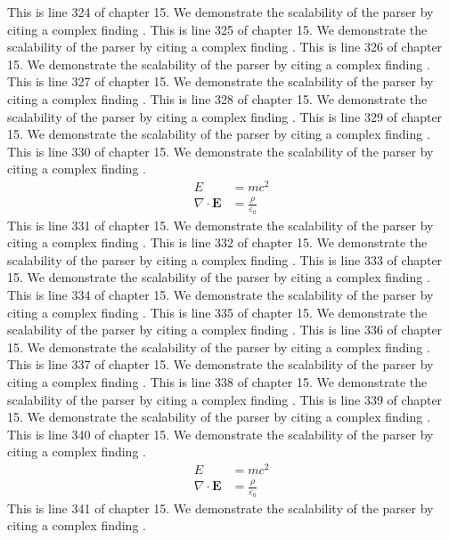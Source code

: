 This is line 324 of chapter 15. We demonstrate the scalability of the parser by citing a complex finding \cite{ref15_324}.
This is line 325 of chapter 15. We demonstrate the scalability of the parser by citing a complex finding \cite{ref15_325}.
This is line 326 of chapter 15. We demonstrate the scalability of the parser by citing a complex finding \cite{ref15_326}.
This is line 327 of chapter 15. We demonstrate the scalability of the parser by citing a complex finding \cite{ref15_327}.
This is line 328 of chapter 15. We demonstrate the scalability of the parser by citing a complex finding \cite{ref15_328}.
This is line 329 of chapter 15. We demonstrate the scalability of the parser by citing a complex finding \cite{ref15_329}.
This is line 330 of chapter 15. We demonstrate the scalability of the parser by citing a complex finding \cite{ref15_330}.
\begin{align*}
  E &= mc^2 \\
  \nabla \cdot \mathbf{E} &= \frac{\rho}{\varepsilon_0}
\end{align*}
This is line 331 of chapter 15. We demonstrate the scalability of the parser by citing a complex finding \cite{ref15_331}.
This is line 332 of chapter 15. We demonstrate the scalability of the parser by citing a complex finding \cite{ref15_332}.
This is line 333 of chapter 15. We demonstrate the scalability of the parser by citing a complex finding \cite{ref15_333}.
This is line 334 of chapter 15. We demonstrate the scalability of the parser by citing a complex finding \cite{ref15_334}.
This is line 335 of chapter 15. We demonstrate the scalability of the parser by citing a complex finding \cite{ref15_335}.
This is line 336 of chapter 15. We demonstrate the scalability of the parser by citing a complex finding \cite{ref15_336}.
This is line 337 of chapter 15. We demonstrate the scalability of the parser by citing a complex finding \cite{ref15_337}.
This is line 338 of chapter 15. We demonstrate the scalability of the parser by citing a complex finding \cite{ref15_338}.
This is line 339 of chapter 15. We demonstrate the scalability of the parser by citing a complex finding \cite{ref15_339}.
This is line 340 of chapter 15. We demonstrate the scalability of the parser by citing a complex finding \cite{ref15_340}.
\begin{align*}
  E &= mc^2 \\
  \nabla \cdot \mathbf{E} &= \frac{\rho}{\varepsilon_0}
\end{align*}
This is line 341 of chapter 15. We demonstrate the scalability of the parser by citing a complex finding \cite{ref15_341}.

